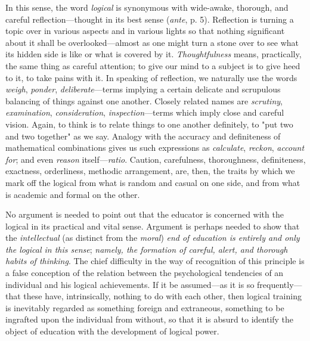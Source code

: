 \documentclass[letterpaper]{book}
\begin{document}
In this sense, the word \emph{logical} is synonymous with wide-awake,
thorough, and careful reflection---thought in its best sense
(\emph{ante}, p. 5). Reflection is turning a topic over in various
aspects and in various lights so that nothing significant about it shall
be overlooked---almost as one might turn a stone over to see what its
hidden side is like or what is covered by it. \emph{Thoughtfulness}
means, practically, the same thing as careful attention; to give our
mind to a subject is to give heed to it, to take pains with it. In
speaking of reflection, we naturally use the words \emph{weigh},
\emph{ponder}, \emph{deliberate}---terms implying a certain delicate and
scrupulous balancing of things against one another. Closely related
names are \emph{scrutiny}, \emph{examination}, \emph{consideration},
\emph{inspection}---terms which imply close and careful vision. Again,
to think is to relate things to one another definitely, to "put two and
two together" as we say. Analogy with the accuracy and definiteness of
mathematical combinations gives us such expressions as \emph{calculate},
\emph{reckon}, \emph{account for}; and even \emph{reason}
itself---\emph{ratio}. Caution, carefulness, thoroughness, definiteness,
exactness, orderliness, methodic arrangement, are, then, the traits by
which we mark off the logical from what is random and casual on one
side, and from what is academic and formal on the other.



No argument is needed to point out that the educator is concerned with
the logical in its practical and vital sense. Argument is perhaps needed
to show that the \emph{intellectual} (as distinct from the \emph{moral})
\emph{end of education is entirely and only the logical in this sense};
\emph{namely,
the formation of careful, alert, and thorough habits of thinking}. The
chief difficulty in the way of recognition of this principle is a false
conception of the relation between the psychological tendencies of an
individual and his logical achievements. If it be assumed---as it is so
frequently---that these have, intrinsically, nothing to do with each
other, then logical training is inevitably regarded as something foreign
and extraneous, something to be ingrafted upon the individual from
without, so that it is absurd to identify the object of education with
the development of logical power.
\end{document}
